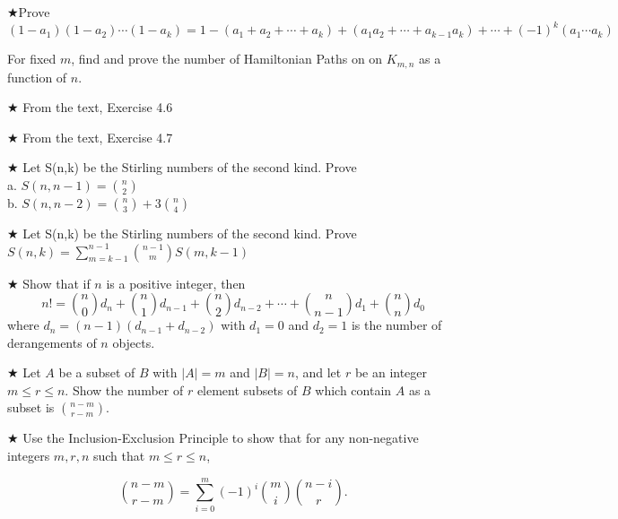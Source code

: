 \begin{proofp} $\bigstar$Prove
$$(1-a_1)(1-a_2) \cdots (1-a_k)= 1- (a_1+a_2+ \cdots+a_k)+ (a_1a_2+\cdots +a_{k-1}a_{k})+ \cdots +(-1)^k(a_1 \cdots a_k) $$
\end{proofp}

\begin{proofp}
For fixed $m$, find and prove the number of Hamiltonian Paths on on $K_{m,n}$ as a function of $n$.
\end{proofp}

\begin{proofp} $\bigstar$
From the text, Exercise 4.6
\end{proofp}

\begin{proofp}$\bigstar$
From the text, Exercise 4.7 
\end{proofp}


\begin{proofp}$\bigstar$
Let S(n,k) be the Stirling numbers of the second kind. Prove \\
a. $S(n, n-1)= \binom{n}{2}$\\
b. $S(n, n-2)= \binom{n}{3}+3\binom{n}{4}$
\end{proofp}



\begin{proofp}$\bigstar$
Let S(n,k) be the Stirling numbers of the second kind. Prove $S(n,k)=\sum_{m=k-1}^{n-1} \binom{n-1}{m} S(m,k-1)$
\end{proofp}



\begin{proofp}$\bigstar$
Show that if $n$ is a positive integer, then
$$ n!=\binom{n}{0}d_n+\binom{n}{1}d_{n-1}+\binom{n}{2}d_{n-2}+ \cdots +\binom{n}{n-1}d_1 +\binom{n}{n}d_0$$
where $d_n=(n-1)(d_{n-1}+d_{n-2})$ with $d_1=0$ and $d_2=1$ is the number of derangements of $n$ objects.
\end{proofp}

\begin{proofp}$\bigstar$
Let $A$ be a subset of $B$ with $|A|=m$ and $|B|=n$, and let $r$ be an integer $m \le r \le n$.  Show the number of $r$ element subsets of $B$ which contain $A$ as a subset is $\binom{n-m}{r-m}$.
\end{proofp}


\begin{proofp}$\bigstar$
Use the Inclusion-Exclusion Principle to show that for any non-negative integers $m,r,n$ such that $m \le r \le n$,

$$\binom{n-m}{r-m}=\sum^{m}_{i=0}(-1)^i \binom{m}{i}\binom{n-i}{r}.$$
\end{proofp}